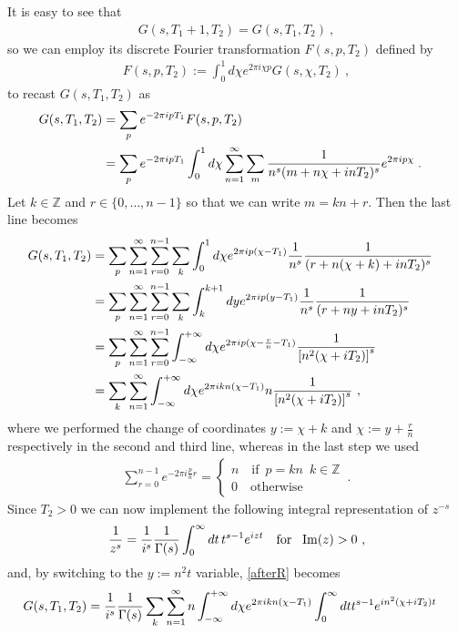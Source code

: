 \documentclass[11pt]{article}
\numberwithin{equation}{section}
\begin{document}
\begin{appendix}
 It is easy to see that 
\begin{align}
 {G}(s,T_1+1,T_2)= {G}(s,T_1,T_2)\ ,
\end{align}
so we can employ its discrete Fourier transformation $F(s,p,T_2)$ defined by
\begin{align}
F(s,p,T_2):=\int_0^1d\chi e^{2\pi i \chi p} G(s,\chi,T_2)\ ,
\end{align}
to recast $ {G}(s, T_1, T_2)$ as
\begin{align}
 {G}(s, T_1, T_2)& = \sum_p e^{-2 \pi i p T_1} F(s,p,T_2)\cr
&=\sum_p e^{-2 \pi i p T_1}\int_{0}^{1} d \chi 
\sum_{n=1 }^{\infty}\sum_{m} \frac{1}{n^s (m+ n\chi+i n T_2)^s} e^{ 2 \pi i p \chi}\;.
\end{align}
Let $k \in \mathbb{Z}$ and $ r \in \{0,\dots, n-1\}$ so that we can write $m = kn+r$. Then the last line becomes
\begin{align}
 {G}(s, T_1, T_2) &= \sum_p \sum_{n = 1}^{\infty} \sum_{r = 0}^{n-1} \sum_k \int_{0}^{1} d \chi e^{2\pi i p ( \chi-T_1)}\frac{1}{n^s}\frac1{( r + n (\chi+k) +i nT_2)^s} \cr &= 
 \sum_p \sum_{n = 1}^{\infty} \sum_{r = 0}^{n-1} \sum_k \int_k^{k+1}d y e^{2\pi i p(y-T_1) }\frac{1}{n^s}\frac1{( r + n y + i n T_2)^s} \cr
 &=\sum_p \sum_{n = 1}^{\infty} \sum_{r = 0}^{n-1} \int_{-\infty}^{+\infty}d\chi e^{2\pi i p(\chi-\frac{r}{n}-T_1) }\frac1{\left[n^2( \chi  +i T_2)\right]^s} \cr
 &=\sum_k \sum_{n = 1}^{\infty}  \int_{-\infty}^{+\infty}d\chi e^{2\pi i kn(\chi-T_1) }n\frac1{\left[n^2( \chi  +i T_2)\right]^s} \ ,
 \label{afterR}
\end{align}
where we performed the change of coordinates $y:=\chi+k$ and $\chi:=y+\frac{r}{n}$ respectively in the second and third line, whereas in the last step we used
\begin{align}
\sum_{r = 0}^{n-1} e^{-2\pi i \frac{p}{n}r}=
\begin{cases}
n \quad  \text{if}\,\,\,p=kn\,\,\,k\in\mathbb{Z}\\
0 \quad \text{otherwise}
\end{cases}\,.
\end{align}
Since $T_2>0$ we can now implement the following integral representation of $z^{-s}$
\begin{align}
\frac{1}{z^s} = \frac{1}{i^s}\frac{1}{\Gamma(s)} \int_{0}^{\infty} d t \, t^{s-1} e^{i z t} \,\,\,\,\,\,\text{for }\,\,\, {\rm Im}(z)>0 \ ,
\end{align}
and, by switching to the $y:=n^2t$ variable, \eqref{afterR} becomes
\begin{align}
 {G}(s, T_1, T_2) &=\frac{1}{i^s}\frac{1}{\Gamma(s)} \sum_k \sum_{n = 1}^{\infty} n \int_{-\infty}^{+\infty}d\chi e^{2\pi i kn(\chi-T_1) }\int_{0}^{\infty} d t  t^{s-1} e^{in^2( \chi  +i T_2)t}\cr

\end{align}
\end{appendix}
\end{document}
